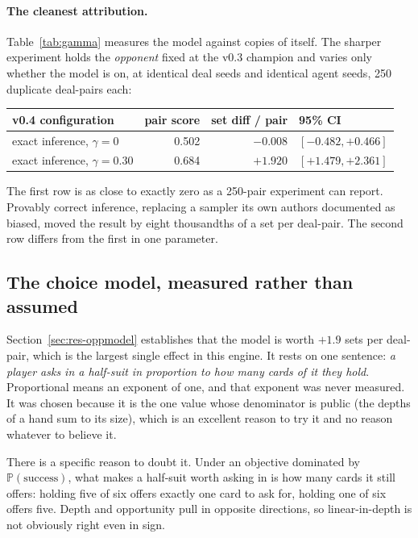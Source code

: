 \documentclass[11pt,letterpaper]{article}
\newcommand{\Prob}{\ensuremath{\mathbb{P}}}
\begin{document}
\paragraph{The cleanest attribution.} Table~\ref{tab:gamma} measures the model
against copies of itself. The sharper experiment holds the \emph{opponent} fixed
at the v0.3 champion and varies only whether the model is on, at identical deal
seeds and identical agent seeds, 250 duplicate deal-pairs each:

\begin{center}
\small
\begin{tabular}{lrrl}
\toprule
v0.4 configuration & pair score & set diff / pair & 95\% CI \\
\midrule
exact inference, $\gamma = 0$ & 0.502 & $-0.008$ & $[-0.482, +0.466]$ \\
exact inference, $\gamma = 0.30$ & 0.684 & $\mathbf{+1.920}$ & $[+1.479, +2.361]$ \\
\bottomrule
\end{tabular}
\end{center}

The first row is as close to exactly zero as a 250-pair experiment can report.
Provably correct inference, replacing a sampler its own authors documented as
biased, moved the result by eight thousandths of a set per deal-pair. The second
row differs from the first in one parameter.

\subsection{The choice model, measured rather than assumed}
\label{sec:res-choicecurve}

Section~\ref{sec:res-oppmodel} establishes that the model is worth $+1.9$ sets
per deal-pair, which is the largest single effect in this engine. It rests on
one sentence: \emph{a player asks in a half-suit in proportion to how many cards
of it they hold}. Proportional means an exponent of one, and that exponent was
never measured. It was chosen because it is the one value whose denominator is
public (the depths of a hand sum to its size), which is an excellent reason
to try it and no reason whatever to believe it.

There is a specific reason to doubt it. Under an objective dominated by
$\Prob(\text{success})$, what makes a half-suit worth asking in is how many cards
it still offers: holding five of six offers exactly one card to ask for, holding
one of six offers five. Depth and opportunity pull in opposite directions, so
linear-in-depth is not obviously right even in sign.
\end{document}
